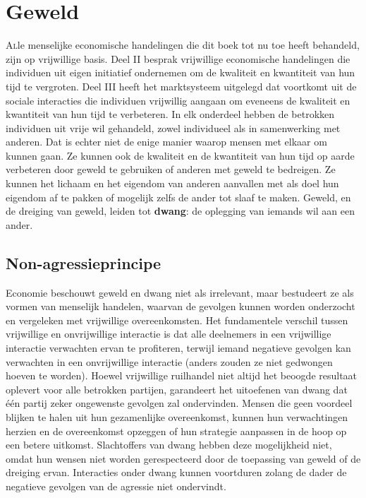 \hypertarget{geweld}{%
\chapter{Geweld}\label{geweld}}

\vspace{-1em}
\lettrine{A}lle menselijke economische handelingen die dit boek tot nu toe heeft behandeld, zijn op vrijwillige basis. Deel II besprak vrijwillige economische handelingen die individuen uit eigen initiatief ondernemen om de kwaliteit en kwantiteit van hun tijd te vergroten. Deel III heeft het marktsysteem uitgelegd dat voortkomt uit de sociale interacties die individuen vrijwillig aangaan om eveneens de kwaliteit en kwantiteit van hun tijd te verbeteren. In elk onderdeel hebben de betrokken individuen uit vrije wil gehandeld, zowel individueel als in samenwerking met anderen. Dat is echter niet de enige manier waarop mensen met elkaar om kunnen gaan. Ze kunnen ook de kwaliteit en de kwantiteit van hun tijd op aarde verbeteren door geweld te gebruiken of anderen met geweld te bedreigen. Ze kunnen het lichaam en het eigendom van anderen aanvallen met als doel hun eigendom af te pakken of mogelijk zelfs de ander tot slaaf te maken. Geweld, en de dreiging van geweld, leiden tot \textbf{dwang}: de oplegging van iemands wil aan een ander.

\hypertarget{non-agressieprincipe}{%
\section{Non-agressieprincipe}\label{non-agressieprincipe}}

Economie beschouwt geweld en dwang niet als irrelevant, maar bestudeert ze als vormen van menselijk handelen, waarvan de gevolgen kunnen worden onderzocht en vergeleken met vrijwillige overeenkomsten. Het fundamentele verschil tussen vrijwillige en onvrijwillige interactie is dat alle deelnemers in een vrijwillige interactie verwachten ervan te profiteren, terwijl iemand negatieve gevolgen kan verwachten in een onvrijwillige interactie (anders zouden ze niet gedwongen hoeven te worden). Hoewel vrijwillige ruilhandel niet altijd het beoogde resultaat oplevert voor alle betrokken partijen, garandeert het uitoefenen van dwang dat één partij zeker ongewenste gevolgen zal ondervinden. Mensen die geen voordeel blijken te halen uit hun gezamenlijke overeenkomst, kunnen hun verwachtingen herzien en de overeenkomst opzeggen of hun strategie aanpassen in de hoop op een betere uitkomst. Slachtoffers van dwang hebben deze mogelijkheid niet, omdat hun wensen niet worden gerespecteerd door de toepassing van geweld of de dreiging ervan. Interacties onder dwang kunnen voortduren zolang de dader de negatieve gevolgen van de agressie niet ondervindt.

